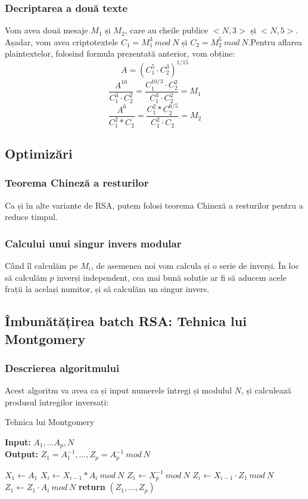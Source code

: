 \documentclass[12]{report}
\begin{document}
		  \subsubsection{Decriptarea a două texte}
		  Vom avea două mesaje $M_1$ și $M_2$, care au cheile publice $<N,3>$ și $<N,5>$. Așadar, vom avea criptotextele $C_1 = M_{1}^{3} \ mod \ N$ și $C_2 = M_{2}^{5} \ mod \ N$.Pentru aflarea plaintextelor, folosind formula prezentată anterior, vom obține:
		  $$ A=(C_{1}^{5} \cdot   C_{2}^{3})^{1/15} $$
		  $$\frac{A^{10}}{C_{1}^{3} \cdot   C_{2}^{2}} = \frac{C_{1}^{10/3} \cdot   C_{2}^{2}}{C_{1}^{3} \cdot   C_{2}^{2} }=M_1$$
		  $$\frac{A^6}{C_{1}^{2} *C_{2}}=\frac{C_{1}^{2} *C_{2}^{6/5}}{C_{1}^{2} \cdot   C_{2}}=M_2 $$
		  
		  \subsection{Optimizări}
		  \subsubsection{Teorema Chineză a resturilor}
		  Ca și în alte variante de RSA, putem folosi teorema Chineză a resturilor pentru a reduce timpul.
		  \subsubsection{Calcului unui singur invers modular}
		  Când îl calculăm pe $M_i$, de asemenea noi vom calcula și o serie de inverși. În loc să calculăm $p$ inverși independent, cea mai bună soluție ar fi să aducem acele frații la același numitor, și să calculăm un singur invers.
		  \subsection{Îmbunătățirea batch RSA: Tehnica lui Montgomery}
		
		
		
		
		
		
		  \subsubsection{Descrierea algoritmului}
		  Acest algoritm va avea ca și input numerele întregi și modulul $N$, și calculează produsul întregilor inversați:  
		  \begin{algorithm}[H]
		   \caption{Tehnica lui Montgomery}
		   \textbf{Input:} $A_1, \dots A_p,N$ \\
		   \textbf{Output:} $Z_1=A_{1}^{-1}, \dots ,Z_p=A_{p}^{-1} \ mod \ N$
		   \begin{algorithmic}
		   	\State $X_1 \gets A_1$
		   	\State $X_i \gets X_{i-1}*A_i \ mod \ N$
		   	\EndFor
		   	\State $Z_1 \gets X_{p}^{-1} \ mod \ N$
		   		\State $Z_i \gets X_{i-1} \cdot   Z_1 \ mod \ N$
		   		\State $Z_1 \gets Z_1 \cdot   A_i \ mod \ N$
		   		\State
		   	\EndFor
		   	\State \textbf{return} $(Z_1, \dots ,Z_p)$ 
		   \end{algorithmic}
		   \end{algorithm}
		   
\end{document}
